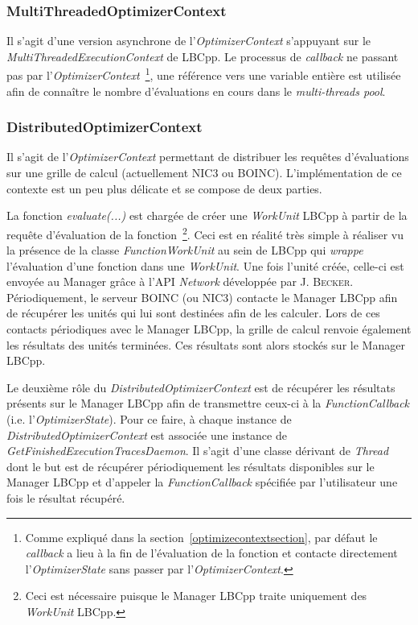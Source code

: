 \documentclass[a4paper, 12pt]{report}
\begin{document}
\subsubsection{MultiThreadedOptimizerContext} 
Il s'agit d'une version asynchrone de l'\textit{OptimizerContext} s'appuyant sur le \textit{MultiThreadedExecutionContext} de LBCpp. Le processus de \textit{callback} ne passant pas par l'\textit{OptimizerContext}~\footnote{Comme expliqué dans la section~\ref{optimizecontextsection}, par défaut le \textit{callback} a lieu à la fin de l'évaluation de la fonction et contacte directement l'\textit{OptimizerState} sans passer par l'\textit{OptimizerContext}.}, une référence vers une variable entière est utilisée afin de connaître le nombre d'évaluations en cours dans le \textit{multi-threads pool}.

\subsubsection{DistributedOptimizerContext}
Il s'agit de l'\textit{OptimizerContext} permettant de distribuer les requêtes d'évaluations sur une grille de calcul (actuellement \textsc{NIC3} ou \textsc{BOINC}). L'implémentation de ce contexte est un peu plus délicate et se compose de deux parties.

La fonction \textit{evaluate(...)} est chargée de créer une \textit{WorkUnit} LBCpp à partir de la requête d'évaluation de la fonction~\footnote{Ceci est nécessaire puisque le Manager LBCpp traite uniquement des \textit{WorkUnit} LBCpp.}. Ceci est en réalité très simple à réaliser vu la présence de la classe \textit{FunctionWorkUnit} au sein de LBCpp qui \textit{wrappe} l'évaluation d'une fonction dans une \textit{WorkUnit}. Une fois l'unité créée, celle-ci est envoyée au Manager grâce à l'API \textit{Network} développée par J. \textsc{Becker}. Périodiquement, le serveur \textsc{BOINC} (ou \textsc{NIC3}) contacte le Manager LBCpp afin de récupérer les unités qui lui sont destinées afin de les calculer. Lors de ces contacts périodiques avec le Manager LBCpp, la grille de calcul renvoie également les résultats des unités terminées. Ces résultats sont alors stockés sur le Manager LBCpp.

Le deuxième rôle du \textit{DistributedOptimizerContext} est de récupérer les résultats présents sur le Manager LBCpp afin de transmettre ceux-ci à la \textit{FunctionCallback} (i.e. l'\textit{OptimizerState}). Pour ce faire, à chaque instance de \textit{DistributedOptimizerContext} est associée une instance de \textit{GetFinishedExecutionTracesDaemon}. Il s'agit d'une classe dérivant de \textit{Thread} dont le but est de récupérer périodiquement les résultats disponibles sur le Manager LBCpp et d'appeler la \textit{FunctionCallback} spécifiée par l'utilisateur une fois le résultat récupéré.
\end{document}
